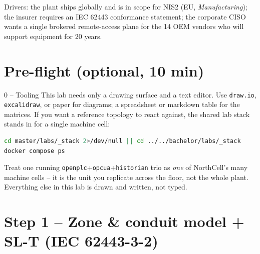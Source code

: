 \documentclass[11pt,a4paper]{article}
\begin{document}
Drivers: the plant ships globally and is in scope for NIS2 (EU,
\emph{Manufacturing}); the insurer requires an IEC 62443 conformance
statement; the corporate CISO wants a single brokered remote-access
plane for the 14 OEM vendors who will support equipment for 20 years.

\section*{Pre-flight (optional, 10 min)}

\begin{stepbox}{0 -- Tooling}
This lab needs only a drawing surface and a text editor. Use
\texttt{draw.io}, \texttt{excalidraw}, or paper for diagrams; a
spreadsheet or markdown table for the matrices. If you want a reference
topology to react against, the shared lab stack stands in for a single
machine cell:
\begin{lstlisting}[language=bash]
cd master/labs/_stack 2>/dev/null || cd ../../bachelor/labs/_stack
docker compose ps
\end{lstlisting}
Treat one running \texttt{openplc}+\texttt{opcua}+\texttt{historian}
trio as \emph{one} of NorthCell's many machine cells -- it is the unit
you replicate across the floor, not the whole plant. Everything else
in this lab is drawn and written, not typed.
\end{stepbox}

\section*{Step 1 -- Zone \& conduit model + SL-T (IEC 62443-3-2)}
\end{document}
